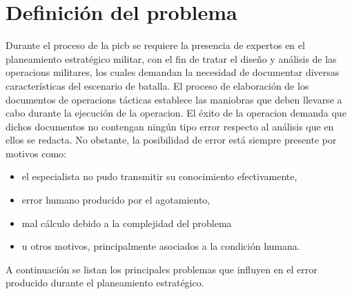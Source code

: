 \section{Definición del problema}

Durante el proceso de la \gls{picb} se requiere la presencia de expertos en el planeamiento estratégico militar, con el fin de tratar el diseño y análisis de las \glspl{operacion} militares, los cuales demandan la necesidad de documentar diversas características del \gls{escenario} de batalla. El proceso de elaboración de los documentos de \glspl{operacion} tácticas establece las \glspl{maniobra} que deben llevarse a cabo durante la ejecución de la \gls{operacion}. El éxito de la \gls{operacion} demanda que dichos documentos no contengan ningún tipo error respecto al análisis que en ellos se redacta. No obstante, la posibilidad de error está siempre presente por motivos como:
\begin{itemize}
\item el especialista no pudo transmitir su conocimiento efectivamente,
\item error humano producido por el agotamiento,
\item mal cálculo debido a la complejidad del problema
\item u otros motivos, principalmente asociados a la condición humana.
\end{itemize}

A continuación se listan los principales problemas que influyen en el error producido durante el planeamiento estratégico.

